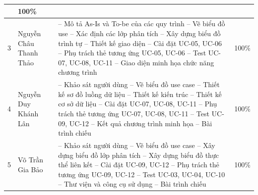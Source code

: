 \begin{longtable}{|c|p{5cm}|p{6.5cm}|c|}
    & 100\% \\ \hline
    3 & Nguyễn Châu Thanh Thảo & -- Mô tả As-Is và To-be của các quy trình
    \newline -- Vẽ biểu đồ use 
    \newline -- Xác định các lớp phân tích
    \newline -- Xây dựng biểu đồ trình tự
    \newline -- Thiết kế giao diện
    \newline -- Cài đặt UC-05, UC-06 
    \newline -- Phụ trách thẻ tương ứng UC-05, UC-06
    \newline -- Test UC-07, UC-08, UC-11
    \newline -- Giao diện minh họa chức năng chương trình
    & 100\% \\ \hline
    4 & Nguyễn Duy Khánh Lân & -- Khảo sát người dùng
    \newline -- Vẽ biểu đồ use case
    \newline -- Thiết kế sơ đồ luồng dữ liệu
    \newline -- Thiết kế kiến trúc
    \newline -- Thiết kế cơ sở dữ liệu
    \newline -- Cài đặt UC-07, UC-08, UC-11  
    \newline -- Phụ trách thẻ tương ứng UC-07, UC-08, UC-11
    \newline -- Test UC-09, UC-12
    \newline -- Kết quả chương trình minh họa
    \newline -- Bài trình chiếu
    & 100\% \\ \hline
    5 & Võ Trần Gia Bảo & -- Khảo sát người dùng
    \newline -- Vẽ biểu đồ use case
    \newline -- Xây dựng biểu đồ lớp phân tích
    \newline -- Xây dựng biểu đồ thực thể liên kết
    \newline -- Cài đặt UC-09, UC-12
    \newline -- Phụ trách thẻ tương ứng UC-09, UC-12
    \newline -- Test UC-03, UC-04, UC-10
    \newline -- Thư viện và công cụ sử dụng
    \newline -- Bài trình chiếu
    & 100\% \\ \hline
\end{longtable}